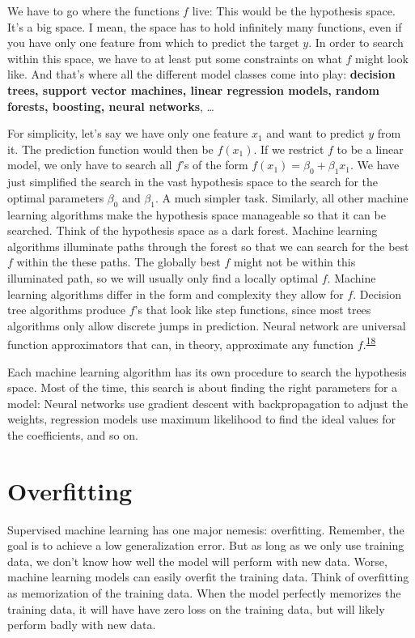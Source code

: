 \documentclass[
  10pt,
]{scrbook}
\begin{document}
We have to go where the functions \(f\) live:
This would be the hypothesis space.
It's a big space.
I mean, the space has to hold infinitely many functions, even if you have only one feature from which to predict the target \(y\).
In order to search within this space, we have to at least put some constraints on what \(f\) might look like.
And that's where all the different model classes come into play: \textbf{decision trees, support vector machines, linear regression models, random forests, boosting, neural networks}, \ldots{}

For simplicity, let's say we have only one feature \(x_1\) and want to predict \(y\) from it.
The prediction function would then be \(f(x_1)\).
If we restrict \(f\) to be a linear model, we only have to search all \(f\)'s of the form \(f(x_1) = \beta_0 + \beta_1 x_1\).
We have just simplified the search in the vast hypothesis space to the search for the optimal parameters \(\beta_0\) and \(\beta_1\).
A much simpler task.
Similarly, all other machine learning algorithms make the hypothesis space manageable so that it can be searched.
Think of the hypothesis space as a dark forest.
Machine learning algorithms illuminate paths through the forest so that we can search for the best \(f\) within the these paths.
The globally best \(f\) might not be within this illuminated path, so we will usually only find a locally optimal \(f\).
Machine learning algorithms differ in the form and complexity they allow for \(f\).
Decision tree algorithms produce \(f\)'s that look like step functions, since most trees algorithms only allow discrete jumps in prediction.
Neural network are universal function approximators that can, in theory, approximate any function \(f\).\textsuperscript{\protect\hyperlink{ref-hornik1989multilayer}{18}}

Each machine learning algorithm has its own procedure to search the hypothesis space.
Most of the time, this search is about finding the right parameters for a model:
Neural networks use gradient descent with backpropagation to adjust the weights, regression models use maximum likelihood to find the ideal values for the coefficients, and so on.

\hypertarget{overfitting}{%
\section{Overfitting}\label{overfitting}}

Supervised machine learning has one major nemesis: overfitting.
Remember, the goal is to achieve a low generalization error.
But as long as we only use training data, we don't know how well the model will perform with new data.
Worse, machine learning models can easily overfit the training data.
Think of overfitting as memorization of the training data.
When the model perfectly memorizes the training data, it will have have zero loss on the training data, but will likely perform badly with new data.
\end{document}
